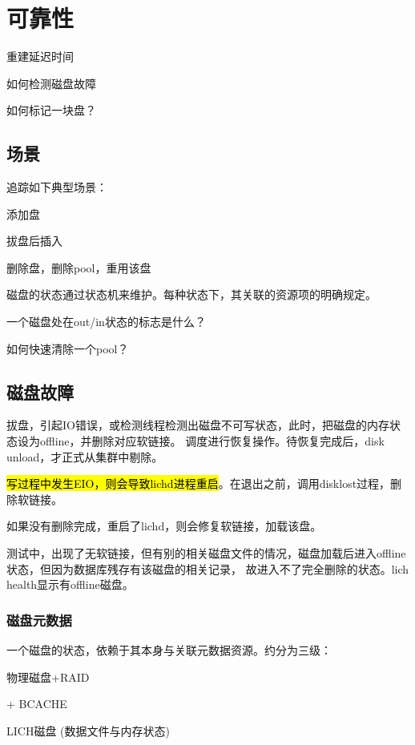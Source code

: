 \chapter{可靠性}

重建延迟时间

如何检测磁盘故障

如何标记一块盘？

\section{场景}

追踪如下典型场景：
\begin{enumbox}
\item 添加盘
\item 拔盘后插入
\item 删除盘，删除pool，重用该盘
\end{enumbox}

磁盘的状态通过状态机来维护。每种状态下，其关联的资源项的明确规定。

一个磁盘处在out/in状态的标志是什么？

如何快速清除一个pool？

\section{磁盘故障}

拔盘，引起IO错误，或检测线程检测出磁盘不可写状态，此时，把磁盘的内存状态设为offline，并删除对应软链接。
调度进行恢复操作。待恢复完成后，disk unload，才正式从集群中剔除。

\hl{写过程中发生EIO，则会导致lichd进程重启}。在退出之前，调用disklost过程，删除软链接。

如果没有删除完成，重启了lichd，则会修复软链接，加载该盘。

测试中，出现了无软链接，但有别的相关磁盘文件的情况，磁盘加载后进入offline状态，但因为数据库残存有该磁盘的相关记录，
故进入不了完全删除的状态。lich health显示有offline磁盘。

\subsection{磁盘元数据}

一个磁盘的状态，依赖于其本身与关联元数据资源。约分为三级：
\begin{enumbox}
\item 物理磁盘+RAID
\item + BCACHE
\item LICH磁盘 (数据文件与内存状态)
\end{enumbox}

